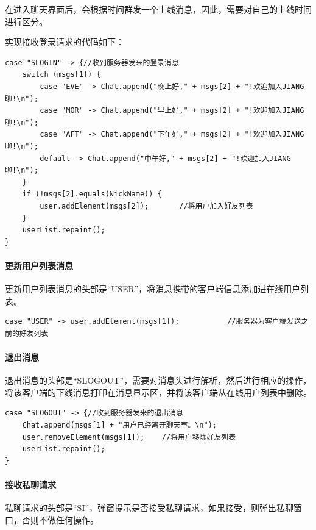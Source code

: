 \documentclass[UTF8,12pt]{article}
\begin{document}
在进入聊天界面后，会根据时间群发一个上线消息，因此，需要对自己的上线时间进行区分。

实现接收登录请求的代码如下：
\begin{lstlisting}[title=接收登录请求,frame=shadowbox]
    case "SLOGIN" -> {//收到服务器发来的登录消息
    switch (msgs[1]) {
        case "EVE" -> Chat.append("晚上好," + msgs[2] + "!欢迎加入JIANG聊!\n");
        case "MOR" -> Chat.append("早上好," + msgs[2] + "!欢迎加入JIANG聊!\n");
        case "AFT" -> Chat.append("下午好," + msgs[2] + "!欢迎加入JIANG聊!\n");
        default -> Chat.append("中午好," + msgs[2] + "!欢迎加入JIANG聊!\n");
    }
    if (!msgs[2].equals(NickName)) {
        user.addElement(msgs[2]);       //将用户加入好友列表
    }
    userList.repaint();
}
\end{lstlisting}

\paragraph{更新用户列表消息}
更新用户列表消息的头部是“USER”，将消息携带的客户端信息添加进在线用户列表。

\begin{lstlisting}[title=更新用户列表消息,frame=shadowbox]
    case "USER" -> user.addElement(msgs[1]);           //服务器为客户端发送之前的好友列表
\end{lstlisting}

\paragraph{退出消息}
退出消息的头部是“SLOGOUT”，需要对消息头进行解析，然后进行相应的操作，将该客户端的下线消息打印在消息显示区，并将该客户端从在线用户列表中删除。

\begin{lstlisting}[title=退出消息,frame=shadowbox]
    case "SLOGOUT" -> {//收到服务器发来的退出消息
    Chat.append(msgs[1] + "用户已经离开聊天室。\n");
    user.removeElement(msgs[1]);    //将用户移除好友列表
    userList.repaint();
}
\end{lstlisting}

\paragraph{接收私聊请求}
私聊请求的头部是“SI”，弹窗提示是否接受私聊请求，如果接受，则弹出私聊窗口，否则不做任何操作。
\end{document}
